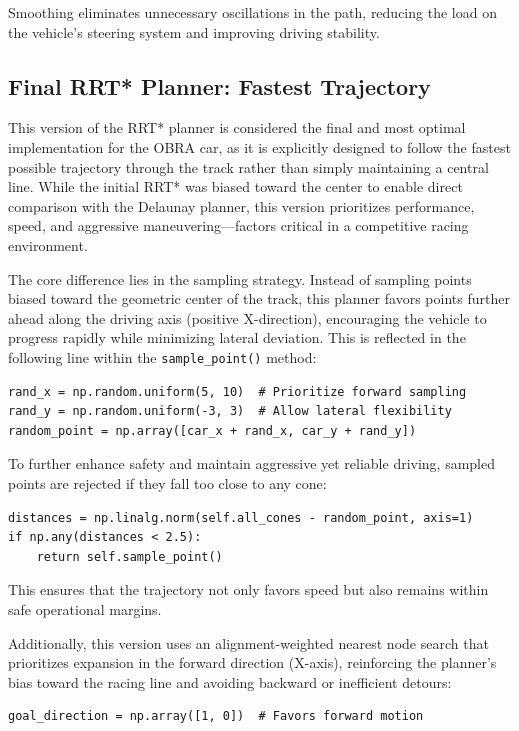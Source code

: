 \documentclass[a4paper,11pt]{report}
\begin{document}
Smoothing eliminates unnecessary oscillations in the path, reducing the load on the vehicle's steering system and improving driving stability.


\subsection{Final RRT* Planner: Fastest Trajectory}

This version of the RRT* planner is considered the final and most optimal implementation for the OBRA car, as it is explicitly designed to follow the fastest possible trajectory through the track rather than simply maintaining a central line. While the initial RRT* was biased toward the center to enable direct comparison with the Delaunay planner, this version prioritizes performance, speed, and aggressive maneuvering—factors critical in a competitive racing environment.

The core difference lies in the sampling strategy. Instead of sampling points biased toward the geometric center of the track, this planner favors points further ahead along the driving axis (positive X-direction), encouraging the vehicle to progress rapidly while minimizing lateral deviation. This is reflected in the following line within the \texttt{sample\_point()} method:

\begin{verbatim}
rand_x = np.random.uniform(5, 10)  # Prioritize forward sampling
rand_y = np.random.uniform(-3, 3)  # Allow lateral flexibility
random_point = np.array([car_x + rand_x, car_y + rand_y])
\end{verbatim}

To further enhance safety and maintain aggressive yet reliable driving, sampled points are rejected if they fall too close to any cone:

\begin{verbatim}
distances = np.linalg.norm(self.all_cones - random_point, axis=1)
if np.any(distances < 2.5):
    return self.sample_point()
\end{verbatim}

This ensures that the trajectory not only favors speed but also remains within safe operational margins.

Additionally, this version uses an alignment-weighted nearest node search that prioritizes expansion in the forward direction (X-axis), reinforcing the planner’s bias toward the racing line and avoiding backward or inefficient detours:

\begin{verbatim}
goal_direction = np.array([1, 0])  # Favors forward motion
\end{verbatim}
\end{document}
